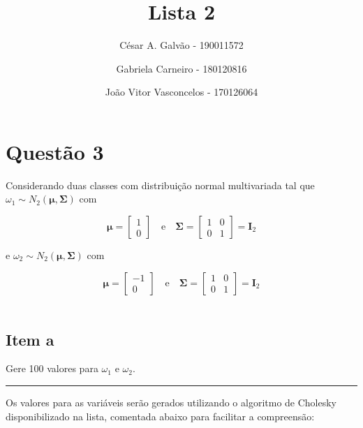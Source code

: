 \documentclass[
  a4paperpaper,
]{article}
\title{Lista 2}
\author{César A. Galvão - 190011572 \and Gabriela Carneiro -
180120816 \and João Vitor Vasconcelos - 170126064}
\date{}
\renewcommand*\contentsname{Índice}
\newcommand\contentsname{Índice}
\begin{document}
\maketitle

\renewcommand*\contentsname{Índice}
{
\hypersetup{linkcolor=}
\setcounter{tocdepth}{2}
\tableofcontents
}
\newpage{}

\section{Questão 3}\label{questuxe3o-3}

Considerando duas classes com distribuição normal multivariada tal que
\(\omega_1 \sim N_2(\boldsymbol{\mu}, \boldsymbol{\Sigma})\) com

\[
\boldsymbol{\mu} = \begin{bmatrix} 1 \\ 0 \end{bmatrix} \quad \text{e} \quad \boldsymbol{\Sigma} = \begin{bmatrix} 1 & 0 \\ 0 & 1 \end{bmatrix} = \boldsymbol{I}_2
\]

e \(\omega_2 \sim N_2(\boldsymbol{\mu}, \boldsymbol{\Sigma})\) com

\[
\boldsymbol{\mu} = \begin{bmatrix} -1 \\ 0 \end{bmatrix} \quad \text{e} \quad \boldsymbol{\Sigma} = \begin{bmatrix} 1 & 0 \\ 0 & 1 \end{bmatrix} = \boldsymbol{I}_2
\] ~

\subsection{Item a}\label{item-a}

Gere 100 valores para \(\omega_1\) e \(\omega_2\).

\begin{center}\rule{0.5\linewidth}{0.5pt}\end{center}

Os valores para as variáveis serão gerados utilizando o algoritmo de
Cholesky disponibilizado na lista, comentada abaixo para facilitar a
compreensão:
\end{document}
